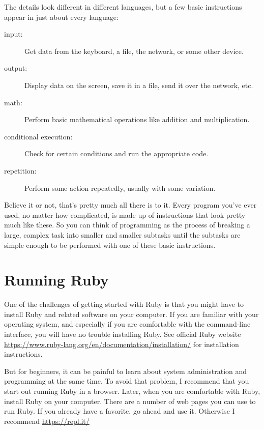 \documentclass[10pt]{book}
\begin{document}
The details look different in different languages, but a few basic
instructions appear in just about every language:

\begin{description}

\item[input:] Get data from the keyboard, a file, the network, or some
other device.

\item[output:] Display data on the screen, save it in a
file, send it over the network, etc.

\item[math:] Perform basic mathematical operations like addition and
multiplication.

\item[conditional execution:] Check for certain conditions and
run the appropriate code.

\item[repetition:] Perform some action repeatedly, usually with
some variation.

\end{description}

Believe it or not, that's pretty much all there is to it.  Every
program you've ever used, no matter how complicated, is made up of
instructions that look pretty much like these.  So you can think of
programming as the process of breaking a large, complex task
into smaller and smaller subtasks until the subtasks are
simple enough to be performed with one of these basic instructions.


\section{Running Ruby}

One of the challenges of getting started with Ruby is that you
might have to install Ruby and related software on your computer.
If you are familiar with your operating system, and especially
if you are comfortable with the command-line interface, you will
have no trouble installing Ruby.  See official Ruby website
\url{https://www.ruby-lang.org/en/documentation/installation/}
for installation instructions.

But for beginners, it can be
painful to learn about system administration and programming at the
same time.  To avoid that problem, I recommend that you start out running Ruby
in a browser.  Later, when you are comfortable with Ruby, install
Ruby on your computer.  There are a number of web pages you can
use to run Ruby.  If you already have a favorite, go ahead and use
it.  Otherwise I recommend \url{https://repl.it/}
\end{document}
